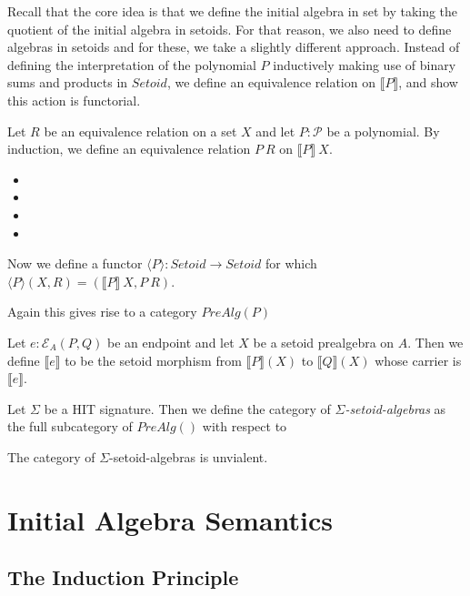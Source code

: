 \documentclass[9pt]{entcs}
\newcommand{\category}[1]{#1}
\newcommand{\1}{\type{1}} %
\newcommand{\setoids}{\category{Setoid}}
\newcommand{\functor}[2]{#1 \rightarrow #2} %
\newcommand{\poly}{\mathcal{P}} %
\newcommand{\ep}[3]{\mathcal{E}_{#1}(#2,#3)} %
\newcommand{\semP}[1]{\llbracket #1 \rrbracket} %
\newcommand{\prealg}[1]{\category{PreAlg}(#1)} %
\newcommand{\semE}[1]{\llbracket #1 \rrbracket} %
\newcommand{\semPT}[1]{\langle #1 \rangle} %
\begin{document}
Recall that the core idea is that we define the initial algebra in set by taking the quotient of the initial algebra in setoids.
For that reason, we also need to define algebras in setoids and for these, we take a slightly different approach.
Instead of defining the interpretation of the polynomial $P$ inductively making use of binary sums and products in $\setoids$, we define an equivalence relation on $\semP{P}$, and show this action is functorial.

\begin{definition}
Let $R$ be an equivalence relation on a set $X$ and let $P : \poly$ be a polynomial.
By induction, we define an equivalence relation $P \> R$ on $\semP{P} \> X$.
\begin{itemize}
	\item
	\item
	\item
	\item
\end{itemize}
Now we define a functor $\semPT{P} : \functor{\setoids}{\setoids}$ for which $\semPT{P}(X,R) = (\semP{P} \> X, P \> R)$.
\end{definition}

Again this gives rise to a category $\prealg{P}$

\begin{definition}
Let $e : \ep{A}{P}{Q}$ be an endpoint and let $X$ be a setoid prealgebra on $A$.
Then we define $\semE{e}$ to be the setoid morphism from $\semE{P}(X)$ to $\semE{Q}(X)$ whose carrier is $\semP{e}$.
\end{definition}

\begin{definition}
Let $\Sigma$ be a HIT signature.
Then we define the category of \emph{$\Sigma$-setoid-algebras} as the full subcategory of $\prealg{}$ with respect to
\end{definition}

\begin{proposition}
The category of $\Sigma$-setoid-algebras is unvialent.
\end{proposition}

\section{Initial Algebra Semantics}

\subsection{The Induction Principle}
\end{document}
